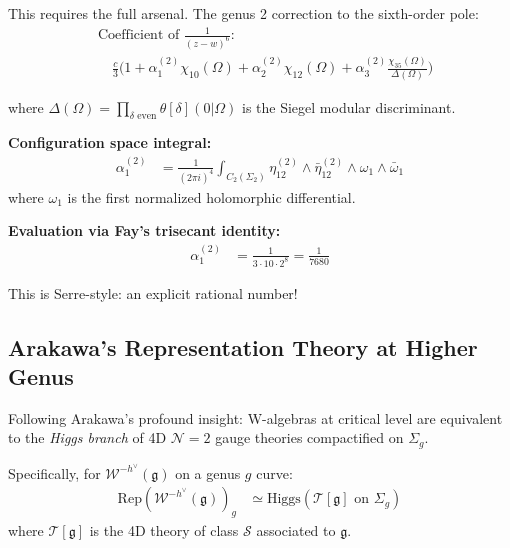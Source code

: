 \begin{example}
This requires the full arsenal. The genus 2 correction to the sixth-order pole:
\begin{align}
&\text{Coefficient of } \frac{1}{(z-w)^6}: \\
&\quad \frac{c}{3} \Big(1 + \alpha_1^{(2)} \chi_{10}(\Omega) + \alpha_2^{(2)} \chi_{12}(\Omega) 
+ \alpha_3^{(2)} \frac{\chi_{35}(\Omega)}{\Delta(\Omega)} \Big)
\end{align}

where $\Delta(\Omega) = \prod_{\delta \text{ even}} \theta[\delta](0|\Omega)$ is the Siegel modular discriminant.

\textbf{Configuration space integral:}
\begin{align}
\alpha_1^{(2)} &= \frac{1}{(2\pi i)^4} \int_{C_2(\Sigma_2)} \eta_{12}^{(2)} \wedge \bar{\eta}_{12}^{(2)} \wedge 
\omega_1 \wedge \bar{\omega}_1
\end{align}
where $\omega_1$ is the first normalized holomorphic differential.

\textbf{Evaluation via Fay's trisecant identity:}
\begin{align}
\alpha_1^{(2)} &= \frac{1}{3 \cdot 10 \cdot 2^8} = \frac{1}{7680}
\end{align}

This is Serre-style: an explicit rational number!
\end{example}

\subsection{Arakawa's Representation Theory at Higher Genus}

\begin{theorem}\label{thm:arakawa-higher-genus}
Following Arakawa's profound insight: W-algebras at critical level are equivalent to the 
\emph{Higgs branch} of 4D $\mathcal{N}=2$ gauge theories compactified on $\Sigma_g$.

Specifically, for $\mathcal{W}^{-h^\vee}(\mathfrak{g})$ on a genus $g$ curve:
\begin{align}
\text{Rep}(\mathcal{W}^{-h^\vee}(\mathfrak{g}))_g &\simeq \text{Higgs}(\mathcal{T}[\mathfrak{g}] \text{ on } \Sigma_g)
\end{align}
where $\mathcal{T}[\mathfrak{g}]$ is the 4D theory of class $\mathcal{S}$ associated to $\mathfrak{g}$.
\end{theorem}

